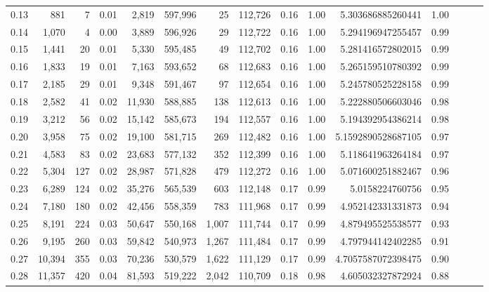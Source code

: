 \begin{tabular}{rrrrrrrrrrrrrrr}
0.13 &     881 &      7 &  0.01 &    2,819 &  597,996 &       25 &  112,726 &  0.16 &  1.00 &       5.303686885260441 &      1.00 \\
0.14 &   1,070 &      4 &  0.00 &    3,889 &  596,926 &       29 &  112,722 &  0.16 &  1.00 &       5.294196947255457 &      0.99 \\
0.15 &   1,441 &     20 &  0.01 &    5,330 &  595,485 &       49 &  112,702 &  0.16 &  1.00 &       5.281416572802015 &      0.99 \\
0.16 &   1,833 &     19 &  0.01 &    7,163 &  593,652 &       68 &  112,683 &  0.16 &  1.00 &       5.265159510780392 &      0.99 \\
0.17 &   2,185 &     29 &  0.01 &    9,348 &  591,467 &       97 &  112,654 &  0.16 &  1.00 &       5.245780525228158 &      0.99 \\
0.18 &   2,582 &     41 &  0.02 &   11,930 &  588,885 &      138 &  112,613 &  0.16 &  1.00 &       5.222880506603046 &      0.98 \\
0.19 &   3,212 &     56 &  0.02 &   15,142 &  585,673 &      194 &  112,557 &  0.16 &  1.00 &       5.194392954386214 &      0.98 \\
0.20 &   3,958 &     75 &  0.02 &   19,100 &  581,715 &      269 &  112,482 &  0.16 &  1.00 &      5.1592890528687105 &      0.97 \\
0.21 &   4,583 &     83 &  0.02 &   23,683 &  577,132 &      352 &  112,399 &  0.16 &  1.00 &       5.118641963264184 &      0.97 \\
0.22 &   5,304 &    127 &  0.02 &   28,987 &  571,828 &      479 &  112,272 &  0.16 &  1.00 &       5.071600251882467 &      0.96 \\
0.23 &   6,289 &    124 &  0.02 &   35,276 &  565,539 &      603 &  112,148 &  0.17 &  0.99 &         5.0158224760756 &      0.95 \\
0.24 &   7,180 &    180 &  0.02 &   42,456 &  558,359 &      783 &  111,968 &  0.17 &  0.99 &       4.952142331331873 &      0.94 \\
0.25 &   8,191 &    224 &  0.03 &   50,647 &  550,168 &    1,007 &  111,744 &  0.17 &  0.99 &       4.879495525538577 &      0.93 \\
0.26 &   9,195 &    260 &  0.03 &   59,842 &  540,973 &    1,267 &  111,484 &  0.17 &  0.99 &       4.797944142402285 &      0.91 \\
0.27 &  10,394 &    355 &  0.03 &   70,236 &  530,579 &    1,622 &  111,129 &  0.17 &  0.99 &      4.7057587072398475 &      0.90 \\
0.28 &  11,357 &    420 &  0.04 &   81,593 &  519,222 &    2,042 &  110,709 &  0.18 &  0.98 &       4.605032327872924 &      0.88 \\

\end{tabular}
